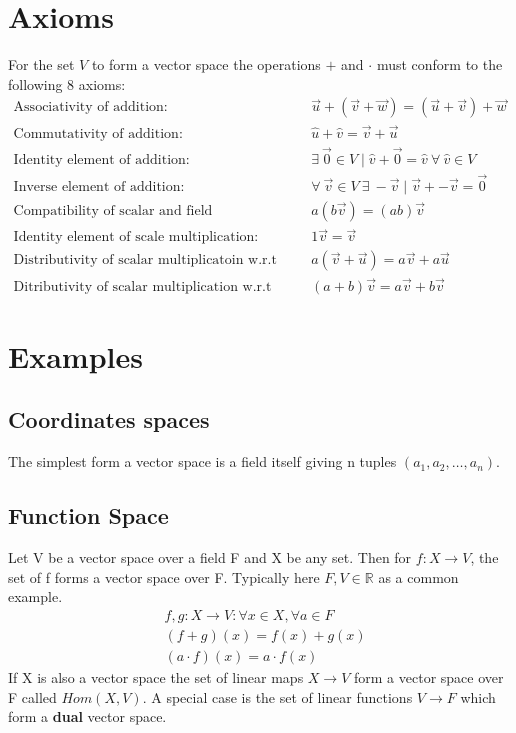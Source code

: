 \documentclass[a4paper]{article}
\begin{document}
\section{Axioms}
For the set $V$ to form a vector space the operations $+$ and $\cdot$ must conform to the following 8 axioms:
\begin{align}
  \text{Associativity of addition: } &\vec{u}+(\vec{v}+\vec{w}) = (\vec{u}+\vec{v})+\vec{w}\\
  \text{Commutativity of addition: }&\hat{u}+\hat{v} = \vec{v}+\vec{u}\\
  \text{Identity element of addition: }&\exists\:\vec{0}\in V \mid \hat{v} + \vec{0} = \hat{v} \:\forall \: \hat{v}\in V\\
  \text{Inverse element of addition: } &\forall \: \vec{v}\in V\: \exists \: -\vec{v} \mid \vec{v} + -\vec{v}=\vec{0}\\
  \text{Compatibility of scalar and field multiplication: }& a(b \vec{v}) = (ab) \vec{v}\\
  \text{Identity element of scale multiplication: }& 1 \vec{v} = \vec{v}\\
  \text{Distributivity of scalar multiplicatoin w.r.t vector addition: } &a(\vec{v}+\vec{u})= a\vec{v}+a\vec{u}\\
  \text{Ditributivity of scalar multiplication w.r.t field addition: }&(a+b)\vec{v} = a\vec{v}+b\vec{v}
\end{align}
\section{Examples}
\subsection{Coordinates spaces}
The simplest form a vector space is a field itself giving n tuples $(a_1, a_2, \dots, a_n)$.
\subsection{Function Space}
Let V be a vector space over a field F and X be any set. Then for $f:X \to V$, the set of f forms a vector space over F. Typically here $F,V \in \mathbb{R}$ as a common example.
\begin{align}
  &f,g:X \to V:\forall x \in X, \forall a \in F\\
  &(f+g)(x)=f(x)+g(x)\\
  &(a\cdot f)(x)=a \cdot f(x)
\end{align}
If X is also a vector space the set of linear maps $X \to V$ form a vector space over F called $Hom(X,V)$. A special case is the set of linear functions $V \to F$ which form a \textbf{dual} vector space.\\ \\
\end{document}
